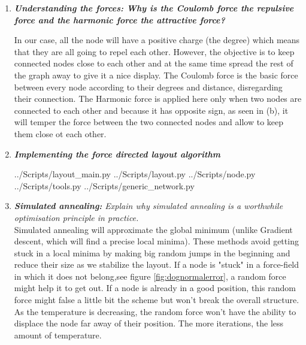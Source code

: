 \documentclass[10pt,a4paper]{article}
\begin{document}
\begin{enumerate}
	
	\item \textit{\textbf{\textbf{Understanding the forces:} Why is the Coulomb force the repulsive force and the harmonic force the attractive force?}}
		
		In our case, all the node will have a positive charge (the degree) which means that they are all going to repel each other. However, the objective is to keep connected nodes close to each other and at the same time spread the rest of the graph away to give it a nice display. The Coulomb force is the basic force between every node according to their degrees and distance, disregarding their connection. The Harmonic force is applied here only when two nodes are connected to each other and because it has opposite sign, as seen in (b), it will temper the force between the two connected nodes and allow to keep them close ot each other.  
		
	
	
	\newpage
	\item \textit{\textbf{Implementing the force directed layout algorithm}}
	
		 {../Scripts/layout\string_main.py}
		 {../Scripts/layout.py}
		 {../Scripts/node.py}
		 {../Scripts/tools.py}
		 {../Scripts/generic\string_network.py}
		
		
		
		
	
	\newpage
	\item \textit{\textbf{Simulated annealing:} Explain why simulated annealing is a worthwhile optimisation principle in practice.}\\
	Simulated annealing will approximate the global minimum (unlike Gradient descent, which will find a precise local minima). These methods avoid getting stuck in a local minima by making big random jumps in the beginning and reduce their size as we stabilize the layout. If a node is "stuck" in a force-field in which it does not belong,see figure \ref{fig:dognormalerror}, a random force might help it to get out. If a node is already in a good position, this random force might false a little bit the scheme but won't break the overall structure. As the temperature is decreasing, the random force won't have the ability to displace the node far away of their position. The more iterations, the less amount of temperature. \\
	

\end{enumerate}
\end{document}
